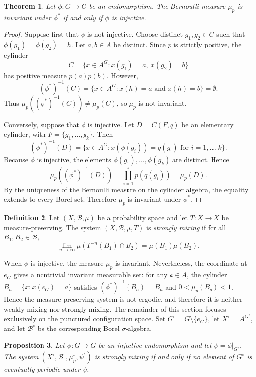 \documentclass[12pt,a4paper]{article}
\newtheorem{theorem}{Theorem}[section]
\newtheorem{proposition}[theorem]{Proposition}
\theoremstyle{definition}
\newtheorem{definition}[theorem]{Definition}
\theoremstyle{remark}
\newcommand{\calB}{\mathcal{B}}
\begin{document}
\begin{theorem}\label{thm:bernoulli-invariance}
Let $\phi:G\to G$ be an endomorphism. The Bernoulli measure $\mu_p$ is invariant under $\phi^*$ if and only if $\phi$ is injective.
\end{theorem}

\begin{proof}
Suppose first that $\phi$ is not injective. Choose distinct $g_1,g_2\in G$ such that $\phi(g_1)=\phi(g_2)=h$. Let $a,b\in A$ be distinct. Since $p$ is strictly positive, the cylinder
\[
C=\{x\in A^G:x(g_1)=a,\ x(g_2)=b\}
\]
has positive measure $p(a)p(b)$. However,
\[
(\phi^*)^{-1}(C)=\{x\in A^G:x(h)=a \text{ and }x(h)=b\}=\emptyset.
\]
Thus $\mu_p((\phi^*)^{-1}(C))\neq \mu_p(C)$, so $\mu_p$ is not invariant.

Conversely, suppose that $\phi$ is injective. Let $D=C(F,q)$ be an elementary cylinder, with $F=\{g_1,\ldots,g_k\}$. Then
\[
(\phi^*)^{-1}(D)=\{x\in A^G:x(\phi(g_i))=q(g_i)\text{ for }i=1,\ldots,k\}.
\]
Because $\phi$ is injective, the elements $\phi(g_1),\ldots,\phi(g_k)$ are distinct. Hence
\[
\mu_p((\phi^*)^{-1}(D))=\prod_{i=1}^k p(q(g_i))=\mu_p(D).
\]
By the uniqueness of the Bernoulli measure on the cylinder algebra, the equality extends to every Borel set. Therefore $\mu_p$ is invariant under $\phi^*$.
\end{proof}

\begin{definition}
Let $(X,\calB,\mu)$ be a probability space and let $T:X\to X$ be measure-preserving. The system $(X,\calB,\mu,T)$ is \emph{strongly mixing} if for all $B_1,B_2\in\calB$,
\[
\lim_{n\to\infty}\mu(T^{-n}(B_1)\cap B_2)=\mu(B_1)\mu(B_2).
\]
\end{definition}

When $\phi$ is injective, the measure $\mu_p$ is invariant. Nevertheless, the coordinate at $e_G$ gives a nontrivial invariant measurable set: for any $a\in A$, the cylinder $B_a=\{x:x(e_G)=a\}$ satisfies $(\phi^*)^{-1}(B_a)=B_a$ and $0<\mu_p(B_a)<1$. Hence the measure-preserving system is not ergodic, and therefore it is neither weakly mixing nor strongly mixing. The remainder of this section focuses exclusively on the punctured configuration space. Set $G^\circ=G\setminus\{e_G\}$, let $X^\circ=A^{G^\circ}$, and let $\calB^\circ$ be the corresponding Borel $\sigma$-algebra.

\begin{proposition}\label{lem:punctured-strong-mixing}
Let $\phi:G\to G$ be an injective endomorphism and let $\psi=\phi|_{G^\circ}$. The system $(X^\circ,\calB^\circ,\mu_p^\circ,\psi^*)$ is strongly mixing if and only if no element of $G^\circ$ is eventually periodic under $\psi$.
\end{proposition}
\end{document}
